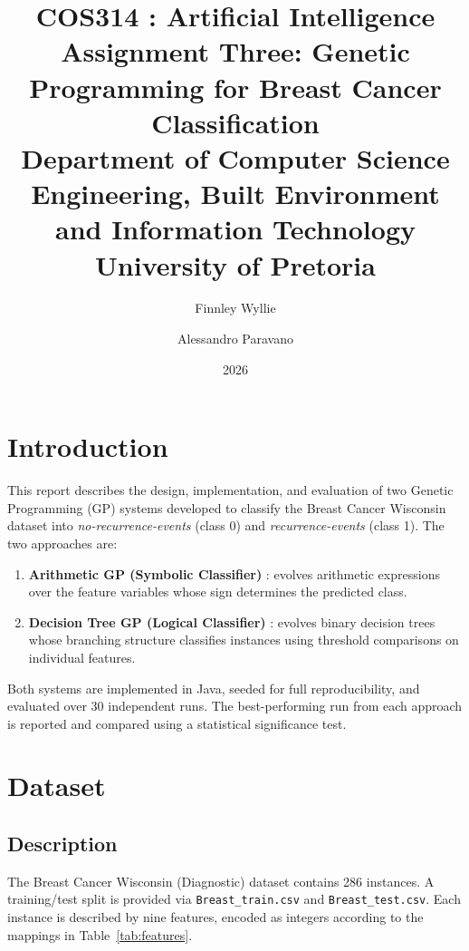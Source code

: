 \documentclass[12pt,a4paper]{article}
\title{
    \textbf{COS314 : Artificial Intelligence} \\[0.5em]
    \large Assignment Three: Genetic Programming for Breast Cancer Classification \\[0.3em]
    \normalsize Department of Computer Science \\
    Engineering, Built Environment and Information Technology \\
    University of Pretoria
}
\author{Finnley Wyllie \and Alessandro Paravano}
\date{2026}
\begin{document}
\maketitle
\tableofcontents
\newpage

\section{Introduction}

This report describes the design, implementation, and evaluation of two Genetic Programming (GP) systems developed to classify the Breast Cancer Wisconsin dataset into \emph{no-recurrence-events} (class 0) and \emph{recurrence-events} (class 1). The two approaches are:

\begin{enumerate}
    \item \textbf{Arithmetic GP (Symbolic Classifier)} : evolves arithmetic expressions over the feature variables whose sign determines the predicted class.
    \item \textbf{Decision Tree GP (Logical Classifier)} : evolves binary decision trees whose branching structure classifies instances using threshold comparisons on individual features.
\end{enumerate}

Both systems are implemented in Java, seeded for full reproducibility, and evaluated over 30 independent runs. The best-performing run from each approach is reported and compared using a statistical significance test.

\section{Dataset}

\subsection{Description}

The Breast Cancer Wisconsin (Diagnostic) dataset contains 286 instances. A training/test split is provided via \texttt{Breast\_train.csv} and \texttt{Breast\_test.csv}. Each instance is described by nine features, encoded as integers according to the mappings in Table~\ref{tab:features}.
\end{document}
